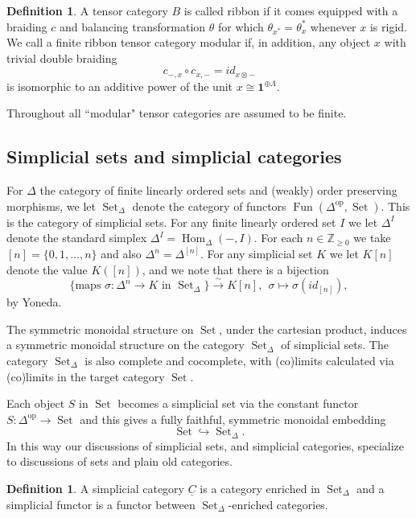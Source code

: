 \documentclass[reqno]{amsart}
\theoremstyle{definition}
\newtheorem{definition}[lemma]{Definition}
\newcommand{\opn}[1]{\operatorname{#1}}
\newcommand{\ot}{\otimes}
\DeclareMathOperator{\Hom}{Hom}
\DeclareMathOperator{\Fun}{Fun}
\renewcommand{\1}{\mathbf{1}}
\begin{document}
\begin{definition}
A tensor category $B$ is called ribbon if it comes equipped with a braiding $c$ and balancing transformation $\theta$ \cite[Definition 8.10.1]{egno15} for which $\theta_{x^{\ast}}=\theta_x^{\ast}$ whenever $x$ is rigid.  We call a finite ribbon tensor category modular if, in addition, any object $x$ with trivial double braiding
\[
c_{-,x}\circ c_{x,-}=id_{x\ot-}
\]
is isomorphic to an additive power of the unit $x\cong \1^{\oplus \Lambda}$.
\end{definition}

Throughout all ``modular" tensor categories are assumed to be finite.

\subsection{Simplicial sets and simplicial categories}

For $\Delta$ the category of finite linearly ordered sets and (weakly) order preserving morphisms, we let $\opn{Set}_{\Delta}$ denote the category of functors $\Fun(\Delta^{\opn{op}},\opn{Set})$. This is the category of simplicial sets.  For any finite linearly ordered set $I$ we let $\Delta^I$ denote the standard simplex $\Delta^I=\Hom_{\Delta}(-,I)$. For each $n\in \mathbb{Z}_{\geq 0}$ we take $[n]=\{0,1,\dots,n\}$ and also $\Delta^n=\Delta^{[n]}$.  For any simplicial set $K$ we let $K[n]$ denote the value $K([n])$, and we note that there is a bijection
\[
\{\text{maps }\sigma:\Delta^n\to K\text{ in }\opn{Set}_{\Delta}\}\overset{\sim}\to K[n],\ \ \sigma\mapsto \sigma(id_{[n]}),
\]
by Yoneda.
\par

The symmetric monoidal structure on $\opn{Set}$, under the cartesian product, induces a symmetric monoidal structure on the category $\opn{Set}_{\Delta}$ of simplicial sets. The category $\opn{Set}_{\Delta}$ is also complete and cocomplete, with (co)limits calculated via (co)limits in the target category $\opn{Set}$.
\par

Each object $S$ in $\opn{Set}$ becomes a simplicial set via the constant functor $S:\Delta^{\opn{op}}\to \opn{Set}$ and this gives a fully faithful, symmetric monoidal embedding
\[
\opn{Set}\hookrightarrow \opn{Set}_{\Delta}.
\]
In this way our discussions of simplicial sets, and simplicial categories, specialize to discussions of sets and plain old categories.

\begin{definition}
A simplicial category $\underline{C}$ is a category enriched in $\opn{Set}_{\Delta}$ and a simplicial functor is a functor between $\opn{Set}_{\Delta}$-enriched categories.
\end{definition}
\end{document}

